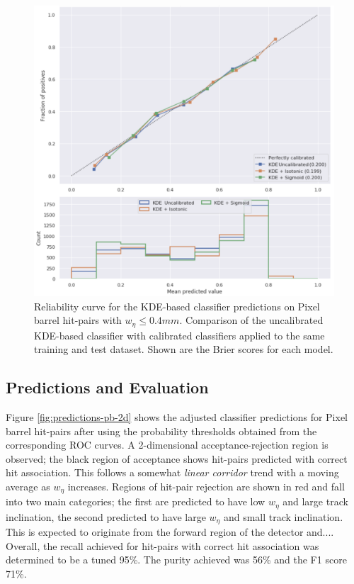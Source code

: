 \begin{figure}[!htbp]
\centering
\includegraphics[width=0.88\linewidth]{images/4-ml-based-predictor/calibration.png}
\caption{Reliability curve for the KDE-based classifier predictions on Pixel barrel hit-pairs with $ w_{\eta} \leq 0.4mm$. Comparison of the uncalibrated KDE-based classifier with calibrated classifiers applied to the same training and test dataset. Shown are the Brier scores for each model.}
\label{fig:calibration}
\end{figure}


\subsection{Predictions and Evaluation}

Figure \ref{fig:predictions-pb-2d} shows the adjusted classifier predictions for Pixel barrel hit-pairs after using the probability thresholds obtained from the corresponding ROC curves. A 2-dimensional acceptance-rejection region is observed; the black region of acceptance shows hit-pairs predicted with correct hit association. This follows a somewhat \textit{linear corridor} trend with a moving average as $w_{\eta}$ increases. Regions of hit-pair rejection are shown in red and fall into two main categories; the first are predicted to have low $w_{\eta}$ and large track inclination, the second predicted to have large $w_{\eta}$ and small track inclination. This is expected to originate from the forward region of the detector and.... Overall, the recall achieved for hit-pairs with correct hit association was determined to be a tuned 95\%. The purity achieved was 56\% and the F1 score 71\%. 

